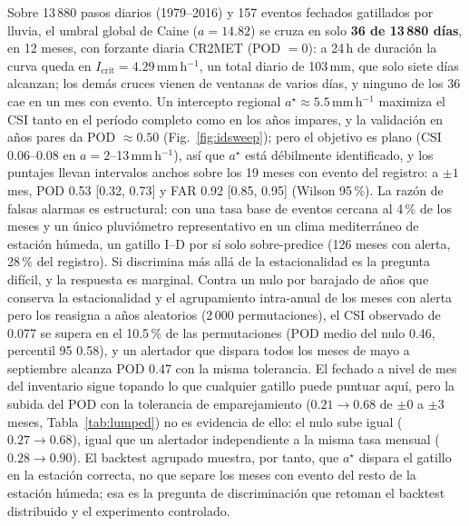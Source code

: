 \documentclass[authoryear,preprint,review,12pt]{elsarticle}
\begin{document}
Sobre 13\,880 pasos diarios (1979--2016) y 157 eventos fechados gatillados por
lluvia, el umbral global de Caine ($a=14.82$) se cruza en solo \textbf{36 de
13\,880 días}, en 12 meses, con forzante diaria CR2MET (POD $=0$): a 24\,h de duración la curva queda en $I_{\mathrm{crit}}=4.29$\,mm\,h$^{-1}$, un
total diario de 103\,mm, que solo siete días alcanzan; los demás cruces vienen de
ventanas de varios días, y ninguno de los 36 cae en un mes con evento. Un
intercepto regional $a^\star\approx5.5$\,mm\,h$^{-1}$ maximiza el CSI tanto en el
período completo como en los años impares, y la validación en años pares da POD
$\approx 0.50$ (Fig.~\ref{fig:idsweep}); pero el objetivo es plano (CSI 0.06--0.08
en $a=2$--13\,mm\,h$^{-1}$), así que $a^\star$ está débilmente identificado, y los
puntajes llevan intervalos anchos sobre los 19 meses con evento del registro: a
$\pm1$ mes, POD 0.53 [0.32, 0.73] y FAR 0.92 [0.85, 0.95] (Wilson 95\,\%). La
razón de falsas alarmas es estructural: con una tasa base de eventos cercana al
4\,\% de los meses y un único pluviómetro representativo en un clima mediterráneo
de estación húmeda, un gatillo I--D por sí solo sobre-predice (126 meses con
alerta, 28\,\% del registro). Si discrimina más allá de la estacionalidad es la
pregunta difícil, y la respuesta es marginal. Contra un nulo por barajado de años
que conserva la estacionalidad y el agrupamiento intra-anual de los meses con
alerta pero los reasigna a años aleatorios (2\,000 permutaciones), el CSI observado
de 0.077 se supera en el 10.5\,\% de las permutaciones (POD medio del nulo 0.46,
percentil 95 0.58), y un alertador que dispara todos los meses de mayo a
septiembre alcanza POD 0.47 con la misma tolerancia. El fechado a nivel de mes del
inventario sigue topando lo que cualquier gatillo puede puntuar aquí, pero la
subida del POD con la tolerancia de emparejamiento ($0.21\to0.68$ de $\pm0$ a
$\pm3$ meses, Tabla~\ref{tab:lumped}) no es evidencia de ello: el nulo sube igual
($0.27\to0.68$), igual que un alertador independiente a la misma tasa mensual
($0.28\to0.90$). El backtest agrupado muestra, por tanto, que $a^\star$ dispara el
gatillo en la estación correcta, no que separe los meses con evento del resto de la
estación húmeda; esa es la pregunta de discriminación que retoman el backtest
distribuido y el experimento controlado.
\end{document}
